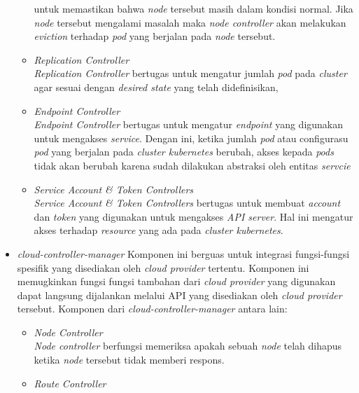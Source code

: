 \begin{itemize}
\begin{itemize}
                    untuk memastikan bahwa \textit{node} tersebut masih dalam kondisi normal.
                    Jika \textit{node} tersebut mengalami masalah maka \textit{node controller} akan melakukan \textit{eviction} terhadap \textit{pod} yang berjalan pada \textit{node} tersebut.
              \item \textit{Replication Controller} \\
                    \textit{Replication Controller} bertugas untuk mengatur jumlah \textit{pod} pada \textit{cluster}
                    agar sesuai dengan \textit{desired state} yang telah didefinisikan,
              \item \textit{Endpoint Controller} \\
                    \textit{Endpoint Controller} bertugas untuk mengatur \textit{endpoint} yang digunakan untuk mengakses \textit{service}.
                    Dengan ini, ketika jumlah \textit{pod} atau configurasu \textit{pod} yang berjalan pada \textit{cluster kubernetes} berubah,
                    akses kepada \textit{pods} tidak akan berubah karena sudah dilakukan abstraksi oleh entitas \textit{servcie}
              \item \textit{Service Account \& Token Controllers} \\
                    \textit{Service Account \& Token Controllers} bertugas untuk membuat \textit{account} dan \textit{token} yang digunakan untuk mengakses \textit{API server}.
                    Hal ini mengatur akses terhadap \textit{resource} yang ada pada \textit{cluster kubernetes}.
          \end{itemize}
    \item \textit{cloud-controller-manager}
          Komponen ini berguas untuk integrasi fungsi-fungsi spesifik yang disediakan oleh \textit{cloud provider}
          tertentu. Komponen ini memugkinkan fungsi fungsi tambahan dari \textit{cloud provider} yang digunakan
          dapat langsung dijalankan melalui API yang disediakan oleh \textit{cloud provider} tersebut.
          Komponen dari \textit{cloud-controller-manager} antara lain:
          \begin{itemize}
              \item \textit{Node Controller} \\
                    \textit{Node controller} berfungsi memeriksa apakah sebuah \textit{node} telah dihapus ketika \textit{node} tersebut tidak memberi respons.
              \item \textit{Route Controller} \\

\end{itemize}
\end{itemize}
